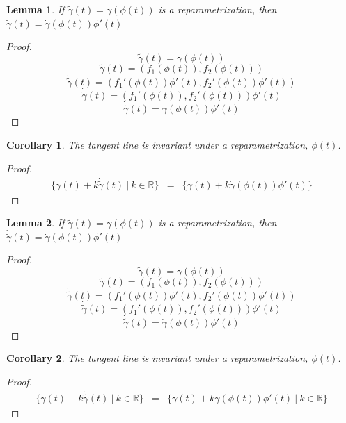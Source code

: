\documentclass[twocolumn,20pt,fleqn]{extarticle}
\theoremstyle{plain}
\newtheorem*{lemma}{Lemma}
\newtheorem*{corollary}{Corollary}
\theoremstyle{definition}
\theoremstyle{remark}
\begin{document}
\clearpage



\begin{lemma}
If $\tilde{\gamma}(t) = \gamma(\phi(t))$ is a reparametrization, then $\dot{\tilde{\gamma}}(t) = \dot{\gamma}(\phi(t))\phi'(t)$
\end{lemma}
\begin{proof}
\[\tilde{\gamma}(t) = \gamma(\phi(t))\]
\[\tilde{\gamma}(t) = (f_1(\phi(t)), f_2(\phi(t)))\]
\[\dot{\tilde{\gamma}}(t) = (f_1'(\phi(t))\phi'(t), f_2'(\phi(t))\phi'(t))\]
\[\dot{\tilde{\gamma}}(t) = (f_1'(\phi(t)), f_2'(\phi(t)))\phi'(t)\]
\[\dot{\tilde{\gamma}}(t) = \dot{\gamma}(\phi(t))\phi'(t)\]
\end{proof}

\begin{corollary}
The tangent line is invariant under a reparametrization, $\phi(t)$.
\end{corollary}
\begin{proof}
\begin{eqnarray*}
\{\gamma(t) + k\dot{\tilde{\gamma}}(t) \ |\ k\in \mathbb{R}\} &=& \{\gamma(t) + k\dot{\gamma}(\phi(t))\phi'(t) \}\end{eqnarray*}\end{proof}


\clearpage



\begin{lemma}
If $\tilde{\gamma}(t) = \gamma(\phi(t))$ is a reparametrization, then $\dot{\tilde{\gamma}}(t) = \dot{\gamma}(\phi(t))\phi'(t)$
\end{lemma}
\begin{proof}
\[\tilde{\gamma}(t) = \gamma(\phi(t))\]
\[\tilde{\gamma}(t) = (f_1(\phi(t)), f_2(\phi(t)))\]
\[\dot{\tilde{\gamma}}(t) = (f_1'(\phi(t))\phi'(t), f_2'(\phi(t))\phi'(t))\]
\[\dot{\tilde{\gamma}}(t) = (f_1'(\phi(t)), f_2'(\phi(t)))\phi'(t)\]
\[\dot{\tilde{\gamma}}(t) = \dot{\gamma}(\phi(t))\phi'(t)\]
\end{proof}

\begin{corollary}
The tangent line is invariant under a reparametrization, $\phi(t)$.
\end{corollary}
\begin{proof}
\begin{eqnarray*}
\{\gamma(t) + k\dot{\tilde{\gamma}}(t) \ |\ k\in \mathbb{R}\} &=& \{\gamma(t) + k\dot{\gamma}(\phi(t))\phi'(t) \ |\ k\in \mathbb{R}\} \end{eqnarray*}\end{proof}
\end{document}
